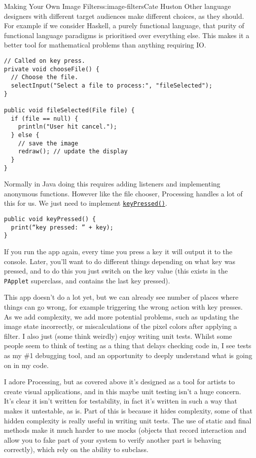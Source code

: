 \begin{aosachapter}{Making Your Own Image Filters}{s:image-filters}{Cate Huston}
Other language designers with different target audiences make different
choices, as they should. For example if we consider Haskell, a purely
functional language, that purity of functional language paradigms is
prioritised over everything else. This makes it a better tool for
mathematical problems than anything requiring IO.

\begin{verbatim}
// Called on key press.
private void chooseFile() {
  // Choose the file.
  selectInput("Select a file to process:", "fileSelected");
}

public void fileSelected(File file) {
  if (file == null) {
    println("User hit cancel.");
  } else {
    // save the image
    redraw(); // update the display
  }
}
\end{verbatim}

\label{responding-to-key-presses}

Normally in Java doing this requires adding listeners and implementing
anonymous functions. However like the file chooser, Processing handles a
lot of this for us. We just need to implement
\href{https://www.processing.org/reference/keyPressed_.html}{\texttt{keyPressed()}}.

\begin{verbatim}
public void keyPressed() {
  print(“key pressed: ” + key);
}
\end{verbatim}

If you run the app again, every time you press a key it will output it
to the console. Later, you'll want to do different things depending on
what key was pressed, and to do this you just switch on the key value
(this exists in the \texttt{PApplet} superclass, and contains the last
key pressed).

\label{writing-tests}

This app doesn't do a lot yet, but we can already see number of places
where things can go wrong, for example triggering the wrong action with
key presses. As we add complexity, we add more potential problems, such
as updating the image state incorrectly, or miscalculations of the pixel
colors after applying a filter. I also just (some think weirdly) enjoy
writing unit tests. Whilst some people seem to think of testing as a
thing that delays checking code in, I see tests as my \#1 debugging
tool, and an opportunity to deeply understand what is going on in my
code.

I adore Processing, but as covered above it's designed as a tool for
artists to create visual applications, and in this maybe unit testing
isn't a huge concern. It's clear it isn't written for testability, in
fact it's written in such a way that makes it untestable, as is. Part of
this is because it hides complexity, some of that hidden complexity is
really useful in writing unit tests. The use of static and final methods
make it much harder to use mocks (objects that record interaction and
allow you to fake part of your system to verify another part is behaving
correctly), which rely on the ability to subclass.


\end{aosachapter}
